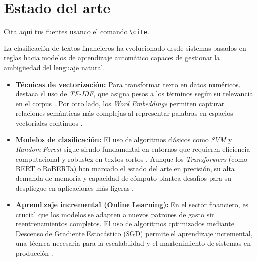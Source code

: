 \section{Estado del arte}
\label{sec:estado_arte}

Cita aquí tus fuentes usando el comando \texttt{\textbackslash cite}.

La clasificación de textos financieros ha evolucionado desde sistemas basados en reglas hacia modelos de aprendizaje automático capaces de gestionar la ambigüedad del lenguaje natural.

\begin{itemize}
    \item \textbf{Técnicas de vectorización:} Para transformar texto en datos numéricos, destaca el uso de \textit{TF-IDF}, que asigna pesos a los términos según su relevancia en el corpus \cite{kamath2018}. Por otro lado, los \textit{Word Embeddings} permiten capturar relaciones semánticas más complejas al representar palabras en espacios vectoriales continuos \cite{minaee2021}.
    \item \textbf{Modelos de clasificación:} El uso de algoritmos clásicos como \textit{SVM} y \textit{Random Forest} sigue siendo fundamental en entornos que requieren eficiencia computacional y robustez en textos cortos \cite{kolluri2019}. Aunque los \textit{Transformers} (como BERT o RoBERTa) han marcado el estado del arte en precisión, su alta demanda de memoria y capacidad de cómputo plantea desafíos para su despliegue en aplicaciones más ligeras \cite{minaee2021}.
    \item \textbf{Aprendizaje incremental (Online Learning):} En el sector financiero, es crucial que los modelos se adapten a nuevos patrones de gasto sin reentrenamientos completos. El uso de algoritmos optimizados mediante Descenso de Gradiente Estocástico (SGD) permite el aprendizaje incremental, una técnica necesaria para la escalabilidad y el mantenimiento de sistemas en producción \cite{kolluri2019}.
\end{itemize}